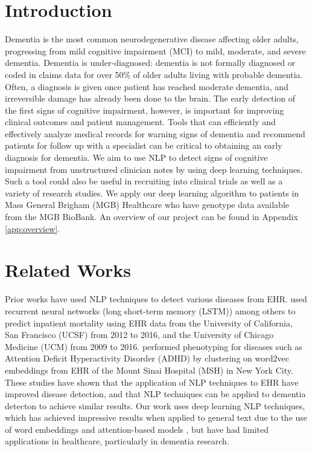 \documentclass[pmlr,twocolumn,10pt]{jmlr} %
\begin{document}
\section{Introduction}
\label{sec:intro} Dementia is the most common neurodegenerative disease affecting older adults, progressing from mild cognitive impairment (MCI) to mild, moderate, and severe dementia. Dementia is under-diagnosed: dementia is not formally diagnosed or coded in claims data for over 50\% of older adults living with probable dementia. Often, a diagnosis is given once patient has reached moderate dementia, and irreversible damage has already been done to the brain.  
The early detection of the first signs of cognitive impairment, however, is important for improving clinical outcomes and patient management. Tools that can efficiently and effectively analyze medical records for warning signs of dementia and recommend patients for follow up with a specialist can be critical to obtaining an early diagnosis for dementia. We aim to use NLP to detect signs of cognitive impairment from unstructured clinician notes by using deep learning techniques. Such a tool could also
be useful in recruiting into clinical trials as well as a
variety of research studies. We apply our deep learning algorithm to patients in Mass General Brigham (MGB) Healthcare who have genotype data available from the MGB BioBank. An overview of our project can be found in Appendix \ref{app:overview}. 

\section{Related Works}
\label{sec:RelatedWorks} 
Prior works have used NLP techniques to detect various diseases from EHR. \citep{rajkomar2018scalable} %
used recurrent neural networks (long short-term memory (LSTM)) among others to predict inpatient mortality using EHR data from the University of California, San Francisco (UCSF) from 2012 to 2016, and the University of Chicago Medicine (UCM) from 2009 to 2016.  \citep{glicksberg2018automated} %
performed phenotyping for diseases such as Attention Deficit Hyperactivity Disorder (ADHD) by clustering on word2vec embeddings from EHR of the Mount Sinai Hospital (MSH) in New York City. These studies have shown that the application of NLP techniques to EHR have improved disease detection, and that NLP techniques can be applied to dementia detecton to achieve similar results. Our work uses deep learning NLP techniques, which has achieved impressive results when applied to general text due to the use of word embeddings and attention-based models \citep{vaswani2017attention,mikolov2013distributed,pennington2014glove,peters2018deep, devlin2018bert}, but have had limited applications in healthcare, particularly in dementia research. 
\end{document}
